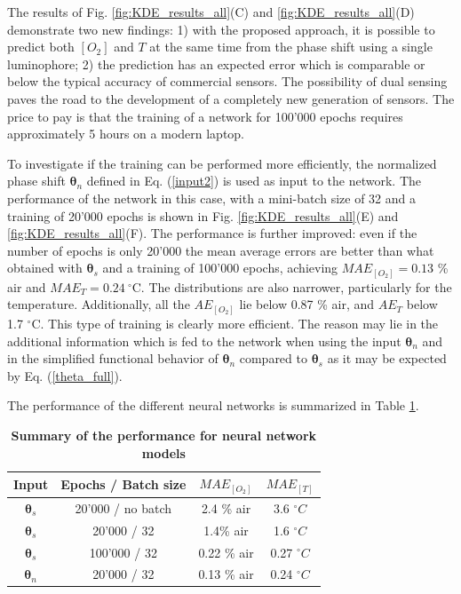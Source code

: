 \documentclass[sensors,article,submit,moreauthors,pdftex,10pt,a4paper]{Definitions/mdpi}
\begin{document}
The results of Fig. \ref{fig:KDE_results_all}(C) and \ref{fig:KDE_results_all}(D) demonstrate two new findings: 1) with the proposed approach, it is possible to predict both $[O_2]$ and $T$ at the same time from the phase shift using a single luminophore; 2) the prediction has an expected error which is comparable or below the typical accuracy of commercial sensors. The possibility of dual sensing paves the road to the development of a completely new generation of sensors.
The price to pay is that the training of a network for 100'000 epochs requires approximately 5 hours on a modern laptop.

To investigate if the training can be performed more efficiently, the normalized phase shift ${\pmb \theta}_n$ defined in Eq. (\ref{input2}) is used as input to the network. The performance of the network in this case, with a mini-batch size of 32 and a training of 20'000 epochs is shown in Fig. \ref{fig:KDE_results_all}(E) and \ref{fig:KDE_results_all}(F). The performance is further improved: even if the number of epochs is only 20'000 the mean average errors are better than what obtained with ${\pmb \theta}_s$ and a training of 100'000 epochs, achieving $MAE_{[O_2]}=0.13$ \% air and $MAE_{T}=0.24 \ ^\circ$C. The distributions are also narrower, particularly for the temperature. Additionally, all the $AE_{[O_2]}$ lie below 0.87 \% air, and  $AE_{T}$ below 1.7 $^\circ$C. This type of training is clearly more efficient. The reason may lie in the additional information which is fed to the network when using the input ${\pmb \theta}_n$ and in the simplified functional behavior of ${\pmb \theta}_n$ compared to ${\pmb \theta}_s$ as it may be expected by Eq. (\ref{theta_full}).


The performance of the different neural networks is summarized in Table \ref{TableMAE_summary}. 
\begin{table}[hbt]
\centering
\caption {\bf Summary of the performance for neural network models}

\begin{tabular}{ cccc}
\smallskip 
 Input & Epochs / Batch size & $MAE_{[O_2]}$ & $MAE_{[T]}$  \\ 
 \hline
${\pmb \theta}_s$ & 20'000 / \textrm{no batch} & 2.4 \% air & 3.6 $^\circ C$\\ 
${\pmb \theta}_s$ & 20'000 / 32 & 1.4\% air & 1.6 $^\circ C$\\ 
${\pmb \theta}_s$& 100'000 / 32 & 0.22 \% air & 0.27 $^\circ C$\\ 
${\pmb \theta}_n$ & 20'000 / 32 & 0.13 \% air & 0.24 $^\circ C$\\ 
\end{tabular}
\label{TableMAE_summary}
\end{table}
\end{document}
